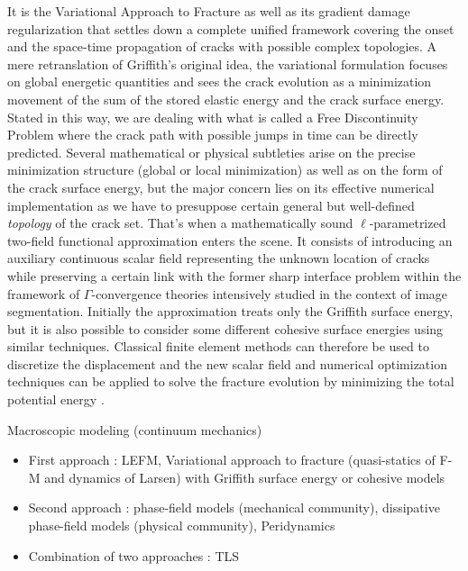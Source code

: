 It is the Variational Approach to Fracture as well as its gradient damage regularization \cite{BourdinFrancfortMarigo:2008} that settles down a complete unified framework covering the onset and the space-time propagation of cracks with possible complex topologies. A mere retranslation of Griffith's original idea, the variational formulation focuses on global energetic quantities and sees the crack evolution as a minimization movement of the sum of the stored elastic energy and the crack surface energy. Stated in this way, we are dealing with what is called a Free Discontinuity Problem where the crack path with possible jumps in time can be directly predicted. Several mathematical or physical subtleties arise on the precise minimization structure (global or local minimization) as well as on the form of the crack surface energy, but the major concern lies on its effective numerical implementation as we have to presuppose certain general but well-defined \emph{topology} of the crack set. That's when a mathematically sound $\ell$-parametrized two-field functional approximation \cite{BourdinFrancfortMarigo:2000} enters the scene. It consists of introducing an auxiliary continuous scalar field representing the unknown location of cracks while preserving a certain link with the former sharp interface problem within the framework of $\Gamma$-convergence theories intensively studied in the context of image segmentation. Initially the approximation treats only the Griffith surface energy, but it is also possible \cite{ContiFocardiIurlano:2015} to consider some different cohesive surface energies using similar techniques. Classical finite element methods can therefore be used to discretize the displacement and the new scalar field and numerical optimization techniques can be applied to solve the fracture evolution by minimizing the total potential energy \cite{PieroLancioniMarch:2007,MauriniBourdinGauthierLazarus:2013,HossainHsuehBourdinBhattachary:2014,MesgarnejadBourdinKhonsari:2014}.

Macroscopic modeling (continuum mechanics)
\begin{itemize}
\item First approach : LEFM, Variational approach to fracture (quasi-statics of F-M and dynamics of Larsen) with Griffith surface energy or cohesive models
\item Second approach : phase-field models (mechanical community), dissipative phase-field models (physical community), Peridynamics
\item Combination of two approaches : TLS
\end{itemize}

